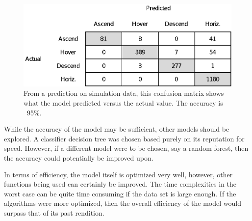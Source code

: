 \documentclass{article}
\begin{document}
\begin{figure}[!h]
	\centering
	\includegraphics{images/matrix}
	\caption{From a prediction on simulation data, this confusion matrix shows what the model predicted versus the actual value. The accuracy is ~95\%.}
	\label{fig:matrix}
\end{figure}

While the accuracy of the model may be sufficient, other models should be explored. A classifier decision tree was chosen based purely on its reputation for speed. However, if a different model were to be chosen, say a random forest, then the accuracy could potentially be improved upon.

In terms of efficiency, the model itself is optimized very well, however, other functions being used can certainly be improved. The time complexities in the worst case can be quite time consuming if the data set is large enough. If the algorithms were more optimized, then the overall efficiency of the model would surpass that of its past rendition.
\end{document}
